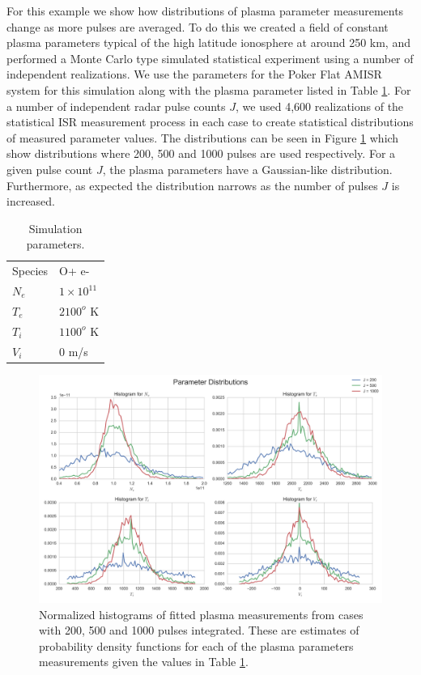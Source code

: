 \documentclass[draft,ras]{agutex}
\begin{document}
\begin{article}
For this example we show how distributions of plasma parameter measurements change as more pulses are averaged. To do this we created a field of constant plasma parameters typical of the high latitude ionosphere at around 250 km, and performed a Monte Carlo type simulated statistical experiment using a number of independent realizations. We use the parameters for the Poker Flat AMISR system for this simulation along with the plasma parameter listed in Table \ref{tb:param1}. For a number of independent radar pulse counts $J$, we used 4,600 realizations of the statistical ISR measurement process in each case to create statistical distributions of measured parameter values. The distributions can be seen in Figure \ref{fig:statshistall} which show distributions where 200, 500 and 1000 pulses are used respectively. For a given pulse count $J$, the plasma parameters have a Gaussian-like distribution. Furthermore, as expected the distribution narrows as the number of pulses $J$ is increased.  

\begin{table}[!t]
\centering
\caption{Simulation parameters.}
\label{tb:param1}
\begin{tabular}{ll}
Species & O+ e-\\
$N_e$    & $1\times 10^{11}$ \\
$T_e$      & $2100^o$ K   \\
$T_i$      & $1100^o$ K \\
$V_i$      & $0$ m/s
\end{tabular}
\end{table}

\begin{figure}[!t]
\centering
\includegraphics[width=5in]{datahist}
\caption{Normalized histograms of fitted plasma measurements from cases with 200, 500 and 1000 pulses integrated. These are estimates of probability density functions for each of the plasma parameters measurements given the values in Table \ref{tb:param1}.}
\label{fig:statshistall}
\end{figure}


\end{article}
\end{document}
